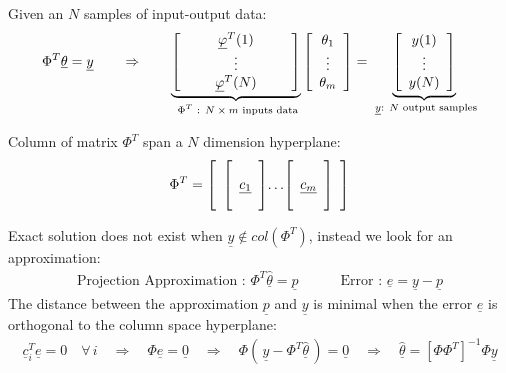 Given an $N$ samples of input-output data:
\begin{align}
\Phi^T \underline{\theta}
= \underline{y}
\quad\quad\Rightarrow\quad\quad
\underbrace{ 
\left[ \begin{array}{c c c c c } 
&& \underline{\varphi}^T(1) && \\
&& \vdots & \\
&& \underline{\varphi}^T(N) && \\
\end{array} \right] }_{\text{ $\Phi^T$ : $N \times m$  inputs data} }
\left[ \begin{array}{c} 
\theta_1 \\ \vdots \\ \theta_m
\end{array} \right]
 = \underbrace{ \left[ \begin{array}{c}  
 y(1) \\ \vdots \\ y(N)\\ 
 \end{array} \right] }_{ \text{ $\underline{y}$: $N$ output samples} } 
\end{align}

Column of matrix $\Phi^T$ span a $N$ dimension hyperplane:
\begin{align}
\Phi^T = 
\left[ \begin{array}{c@{}c@{}c}  
\left[  \begin{array}{c}  \\ \underline{c_1} \\ \\ \end{array} \right] &  \ldots & \left[  \begin{array}{c} \\ \underline{c_m} \\ \\ \end{array} \right]
\end{array} \right]
\end{align}

Exact solution does not exist when $\underline{y} \notin col( \Phi^T )$, instead we look for an approximation:
\begin{align}
\text{Projection Approximation : }
\Phi^T \hat{\underline{\theta}}= \underline{p}
\quad\quad\quad
\text{Error : }
\underline{e} = \underline{y} - \underline{p}
\end{align}
The distance between the approximation $\underline{p}$ and $\underline{y}$ is minimal when the error $\underline{e}$ is orthogonal to the column space hyperplane:
\begin{align}
\underline{c}_i^T \underline{e}= 0 \quad \forall \, i
\quad\Rightarrow\quad
\Phi \underline{e}= \underline{0}
\quad\Rightarrow\quad
\Phi ( \, \underline{y} - \Phi^T \hat{\underline{\theta}} \, )= \underline{0}
\quad\Rightarrow\quad
\hat{\underline{\theta}} = \left[ \Phi \Phi^T \right]^{-1} \Phi \underline{y}
\end{align}

